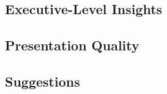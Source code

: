 
\subsection{Executive-Level Insights}


\subsection{Presentation Quality}


\subsection{Suggestions}

